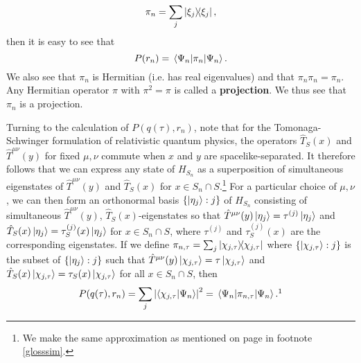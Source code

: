 \begin{equation}\label{tauprojection}
\pi_n=\sum_j\dyad{\xi_j},
\end{equation}
then it is easy to see that
\begin{equation}\label{Prn}
	P(r_n)=\ev*{\pi_n}{\Psi_n}.
\end{equation}
We also see that $\pi_n$ is Hermitian (i.e. has real eigenvalues) and that $\pi_n \pi_n = \pi_n$. Any Hermitian operator $\pi$ with $\pi^2=\pi$ is called a \textbf{projection}. We thus see that $\pi_n$ is a projection.

Turning to the calculation of $P(q(\tau), r_n)$, note that for the Tomonaga-Schwinger formulation of relativistic quantum physics, the operators $\hat{T}_S(x)$ and $\hat{T}^{\mu\nu}(y)$ for fixed $\mu,\nu$ commute when $x$ and $y$ are spacelike-separated. It therefore follows that we can express any state of $H_{S_n}$ as a superposition of simultaneous eigenstates of $\hat{T}^{\mu\nu}(y)$ and $\hat{T}_S(x)$ for $x\in S_n\cap S$.\footnote{We make the same approximation as mentioned on page \pageref{simultaneous} in footnote \ref{glosssim}.}  For a particular choice of $\mu,\nu$, we can then form an orthonormal basis $\{\ket{\eta_j}:j\}$ of $H_{S_n}$ consisting of simultaneous $\hat{T}^{\mu\nu}(y)$, $\hat{T}_S(x)$-eigenstates so that $\hat{T}^{\mu\nu}(y)\ket{\eta_j}=\tau^{(j)}\ket{\eta_j}$ and $\hat{T}_{S}(x)\ket{\eta_j}=\tau_S^{(j)}(x)\ket{\eta_j}$ for $x\in S_n\cap S$, where $\tau^{(j)}$ and $\tau_S^{(j)}(x)$ are the corresponding eigenstates. If we define  $\pi_{n,\tau}=\sum_j\dyad{\chi_{j,\tau}}$ where $\{\ket{\chi_{j,\tau}}:j\}$ is the subset of $\{\ket{\eta_j}:j\}$ such that $\hat{T}^{\mu\nu}(y)\ket{\chi_{j,\tau}}=\tau\ket{\chi_{j,\tau}}$ and $\hat{T}_S(x)\ket{\chi_{j,\tau}}=\tau_S(x)\ket{\chi_{j,\tau}}$ for all $x\in S_n\cap S$, then 
\begin{equation}\label{pqtauri}
P(q(\tau), r_n)=\sum_j \abs{ \ip{\chi_{j,\tau}}{\Psi_n}}^2=\ev*{\pi_{n,\tau}}{\Psi_n}.\protect\footnotemark
\end{equation}
